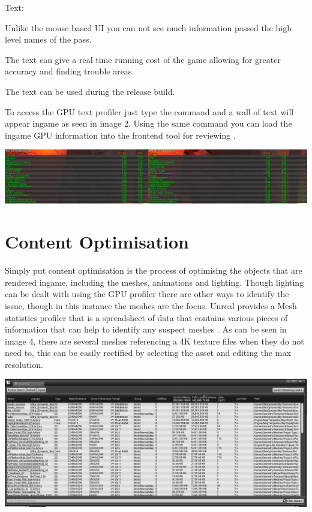 \documentclass{scrartcl}
\begin{document}
Text:
\begin{description}[font=$\bullet$~\normalfont\scshape\color{red!50!black}]
\item Unlike the mouse based UI you can not see much information passed the high level names of the pass.
\item The text can give a real time running cost of the game allowing for greater accuracy and finding trouble areas.
\item The text can be used during the release build.
\end{description}

To access the GPU text profiler just type the command  and a wall of text will appear ingame as seen in image 2. Using the same  command you can load the ingame GPU information into the frontend tool for reviewing \cite{UEGPU}.

\includegraphics[width=\textwidth]{Image2}

\section{Content Optimisation}
Simply put content optimisation is the process of optimising the objects that are rendered ingame, including the meshes, animations and lighting. Though lighting can be dealt with using the GPU profiler there are other ways to identify the issue,	 though in this instance the meshes are the focus. Unreal provides a Mesh statistics profiler that is a spreadsheet of data that contains various pieces of information that can help to identify any suspect meshes \cite{Content}. As can be seen in image 4, there are several meshes referencing a 4K texture files when they do not need to, this can be easily rectified by selecting the asset and editing the max resolution.

\includegraphics[width=\textwidth]{Image3}
\end{document}
